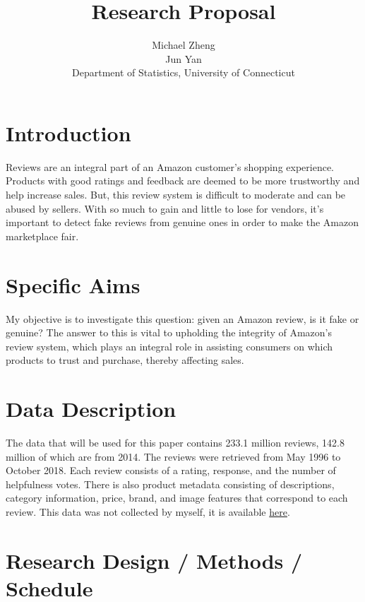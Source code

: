 \documentclass[12pt, letterpaper, titlepage]{article}
\title{Research Proposal}
\author{Michael Zheng\\
  Jun Yan\\[1ex]
  Department of Statistics, University of Connecticut\\
}
\date{}
\begin{document}
\maketitle

\doublespace

\section{Introduction}
\label{sec:intro}

Reviews are an integral part of an Amazon customer's shopping experience. Products with good ratings and feedback are deemed to be more trustworthy and help increase sales. \citep{article} But, this review system is difficult to moderate and can be abused by sellers. With so much to gain and little to lose for vendors, it's important to detect fake reviews from genuine ones in order to make the Amazon marketplace fair. \citep{pendyala_2019}

\section{Specific Aims}
\label{sec:specific_aims}

My objective is to investigate this question: given an Amazon review, is it fake or genuine? The answer to this is vital to upholding the integrity of Amazon's review system, which plays an integral role in assisting consumers on which products to trust and purchase, thereby affecting sales. \citep{article}

\section{Data Description}
\label{sec:data}

The data that will be used for this paper contains 233.1 million reviews, 142.8 million of which are from 2014. The reviews were retrieved from May 1996 to October 2018. Each review consists of a rating, response, and the number of helpfulness votes. There is also product metadata consisting of descriptions, category information, price, brand, and image features that correspond to each review. This data was not collected by myself, it is available \href{https://nijianmo.github.io/amazon/index.html}{here}. \citep{ni_li_mcauley_2019}

\section{Research Design / Methods / Schedule}
\label{sec:methodology}
\end{document}

